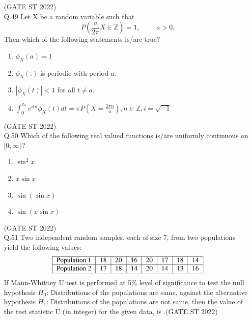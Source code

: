 \documentclass[journal,12pt,onecolumn]{IEEEtran}
\theoremstyle{remark}
\begin{document}
\hfill (GATE ST 2022)\\
	\vspace{2em}
Q.49 Let X be a random variable such that 
\[
P\left(\frac{a}{2\pi}X \in \mathbb{Z}\right) = 1, \hspace{1cm} a > 0.
\]
Then which of the following statements is/are true?
\begin{multicols}{2}
\begin{enumerate}[label=\Alph*.] 
	\item $\phi_X(a) = 1$
	\item $\phi_X(.)$ is periodic with period a.
	\item $|\phi_X(t)| < 1$ for all $t \neq a$.
	\item $\int_{0}^{2\pi} e^{itn} \phi_X(t) dt = \pi P\left(X = \frac{2\pi n}{a}\right), n \in \mathbb{Z}, i = \sqrt{-1}$
\end{enumerate}
\end{multicols}
\hfill (GATE ST 2022)\\
Q.50 Which of the following real valued functions is/are uniformly continuous on $[0, \infty)$?
\begin{multicols}{4}
\begin{enumerate}[label=\Alph*.] 
	\item $\sin^2 x$
	\item $x \sin x$
	\item $\sin(\sin x)$
	\item $\sin(x \sin x)$
	
\end{enumerate}
\end{multicols}
\hfill (GATE ST 2022)\\
	\vspace{2em}
Q.51 Two independent random samples, each of size 7, from two populations yield the following values:
\[
\begin{tabular}{|c|c|c|c|c|c|c|c|}
	\hline
	Population 1 & 18 & 20 & 16 & 20 & 17 & 18 & 14 \\
	\hline
	Population 2 & 17 & 18 & 14 & 20 & 14 & 13 & 16 \\
	\hline
\end{tabular} 
\]
If Mann-Whitney U test is performed at 5\% level of significance to test the null hypothesis $H_0$: Distributions of the populations are same, against the alternative hypothesis $H_1$: Distributions of the populations are not same, then the value of the test statistic U (in integer) for the given data, is \underline{\hspace{2cm}}.\hfill (GATE ST 2022)\\
\end{document}
